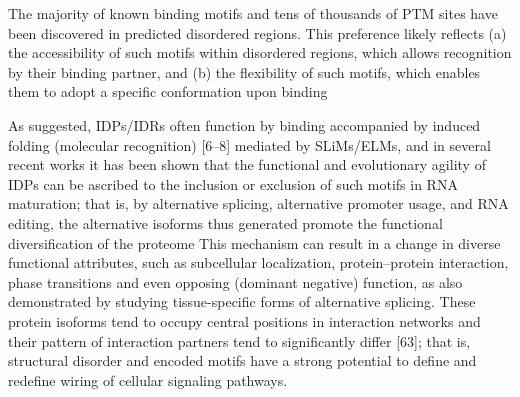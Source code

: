 The majority of known
binding motifs and tens of thousands of PTM sites have been
discovered in predicted disordered regions.
This preference likely reflects (a)
the accessibility of such motifs within disordered regions, which
allows recognition by their binding partner, and (b) the flexibility
of such motifs, which enables them to adopt a specific conformation upon binding 




As suggested, IDPs/IDRs often function by binding accompanied by induced folding (molecular recognition) [6–8] mediated by SLiMs/ELMs, and in several recent
works it has been shown that the functional and evolutionary agility of IDPs can be ascribed to the inclusion or exclusion of such motifs in RNA maturation; that is, by alternative splicing, alternative promoter usage, and RNA
editing, the alternative isoforms thus generated promote the functional diversification of the proteome
This mechanism can result in a change in diverse functional attributes, such as subcellular localization, protein–protein interaction, phase transitions and even opposing (dominant negative) function, as also demonstrated by
studying tissue-specific forms of alternative splicing. These protein isoforms tend to occupy central positions in interaction networks and their pattern of interaction partners tend to significantly differ [63]; that is, structural disorder
and encoded motifs have a strong potential to define and redefine wiring of cellular signaling pathways.



% 
% 











